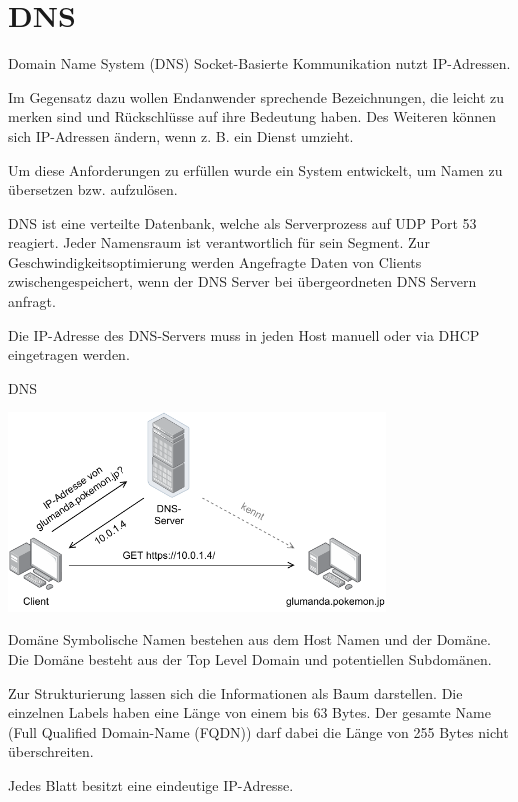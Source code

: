 \section{DNS}

\begin{defi}{Domain Name System (DNS)}
    Socket-Basierte Kommunikation nutzt IP-Adressen.

    Im Gegensatz dazu wollen Endanwender sprechende Bezeichnungen, die leicht zu merken sind und Rückschlüsse auf ihre Bedeutung haben.
    Des Weiteren können sich IP-Adressen ändern, wenn z. B. ein Dienst umzieht.

    Um diese Anforderungen zu erfüllen wurde ein System entwickelt, um Namen zu übersetzen bzw. aufzulösen.

    DNS ist eine verteilte Datenbank, welche als Serverprozess auf UDP Port 53 reagiert.
    Jeder Namensraum ist verantwortlich für sein Segment.
    Zur Geschwindigkeitsoptimierung werden Angefragte Daten von Clients zwischengespeichert, wenn der DNS Server bei übergeordneten DNS Servern anfragt.

    Die IP-Adresse des DNS-Servers muss in jeden Host manuell oder via DHCP eingetragen werden.
\end{defi}

\begin{example}{DNS}
    \begin{center}
        \includegraphics[width=0.75\textwidth]{includes/figures/example_dns.pdf}
    \end{center}
\end{example}

\begin{defi}{Domäne}
    Symbolische Namen bestehen aus dem Host Namen und der Domäne.
    Die Domäne besteht aus der Top Level Domain und potentiellen Subdomänen.

    Zur Strukturierung lassen sich die Informationen als Baum darstellen.
    Die einzelnen Labels haben eine Länge von einem bis 63 Bytes.
    Der gesamte Name (Full Qualified Domain-Name (FQDN)) darf dabei die Länge von 255 Bytes nicht überschreiten.

    Jedes Blatt besitzt eine eindeutige IP-Adresse.
\end{defi}

